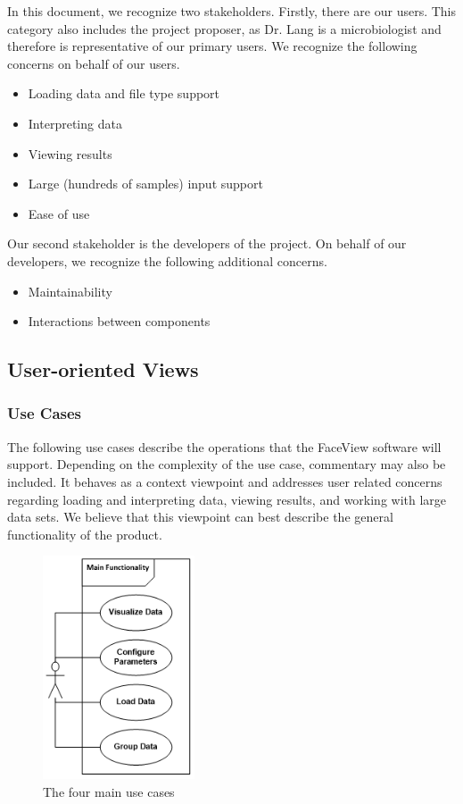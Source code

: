 \documentclass[letterpaper,10pt, onecolumn, draftclsnofoot]{IEEEtran}
\begin{document}
In this document, we recognize two stakeholders. Firstly, there are our users. This category also includes the project proposer, as Dr. Lang is a microbiologist and therefore is representative of our primary users. We recognize the following concerns on behalf of our users.

\begin{itemize}
	\item Loading data and file type support
	\item Interpreting data
	\item Viewing results
	\item Large (hundreds of samples) input support
	\item Ease of use
\end{itemize}

Our second stakeholder is the developers of the project. On behalf of our developers, we recognize the following additional concerns.

\begin{itemize}
	\item Maintainability
	\item Interactions between components
\end{itemize}

\subsection{User-oriented Views}
\subsubsection{Use Cases}
The following use cases describe the operations that the FaceView software will support. Depending on the complexity of the use case, commentary may also be included. It behaves as a context viewpoint and addresses user related concerns regarding loading and interpreting data, viewing results, and working with large data sets. We believe that this viewpoint can best describe the general functionality of the product.

\begin{figure}[h]
	\includegraphics[width=0.4\textwidth]{UseCases.PNG}
	\caption{The four main use cases}
	\label{fig:usecases}
\end{figure}
\end{document}
